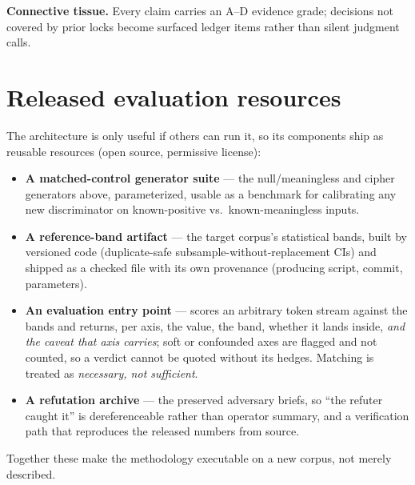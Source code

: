 \documentclass[11pt]{article}
\begin{document}
\textbf{Connective tissue.} Every claim carries an A--D evidence grade; decisions not covered by
prior locks become surfaced ledger items rather than silent judgment calls.

\section{Released evaluation resources}
\label{sec:resources}
The architecture is only useful if others can run it, so its components ship as reusable resources
(open source, permissive license):
\begin{itemize}[leftmargin=1.2em,itemsep=1pt]
  \item \textbf{A matched-control generator suite} --- the null/meaningless and cipher generators
  above, parameterized, usable as a benchmark for calibrating any new discriminator on
  known-positive vs.\ known-meaningless inputs.
  \item \textbf{A reference-band artifact} --- the target corpus's statistical bands, built by
  versioned code (duplicate-safe subsample-without-replacement CIs) and shipped as a checked file
  with its own provenance (producing script, commit, parameters).
  \item \textbf{An evaluation entry point} --- scores an arbitrary token stream against the bands
  and returns, per axis, the value, the band, whether it lands inside, \emph{and the caveat that
  axis carries}; soft or confounded axes are flagged and not counted, so a verdict cannot be
  quoted without its hedges. Matching is treated as \emph{necessary, not sufficient}.
  \item \textbf{A refutation archive} --- the preserved adversary briefs, so ``the refuter caught
  it'' is dereferenceable rather than operator summary, and a verification path that reproduces
  the released numbers from source.
\end{itemize}
Together these make the methodology executable on a new corpus, not merely described.
\end{document}
